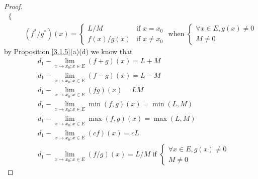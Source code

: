 \begin{proof}
\begin{align*}
\begin{cases}
                                                     \end{cases}                             \\
                                      & (f^* / g^*)(x) = \begin{cases}
                                                             L / M       & \text{if } x = x_0    \\
                                                             f(x) / g(x) & \text{if } x \neq x_0
                                                         \end{cases} \text{ when } \begin{cases}
                                                                                       \forall x \in E, g(x) \neq 0 \\
                                                                                       M \neq 0
                                                                                   \end{cases}
    \end{align*}
    by Proposition \ref{3.1.5}(a)(d) we know that
    \begin{align*}
         & d_1 - \lim_{x \to x_0 ; x \in E} (f + g)(x) = L + M                                          \\
         & d_1 - \lim_{x \to x_0 ; x \in E} (f - g)(x) = L - M                                          \\
         & d_1 - \lim_{x \to x_0 ; x \in E} (fg)(x) = LM                                                \\
         & d_1 - \lim_{x \to x_0 ; x \in E} \min(f, g)(x) = \min(L, M)                                  \\
         & d_1 - \lim_{x \to x_0 ; x \in E} \max(f, g)(x) = \max(L, M)                                  \\
         & d_1 - \lim_{x \to x_0 ; x \in E} (cf)(x) = cL                                                \\
         & d_1 - \lim_{x \to x_0 ; x \in E} (f / g)(x) = L / M \text{ if } \begin{cases}
                                                                               \forall x \in E, g(x) \neq 0 \\
                                                                               M \neq 0
                                                                           \end{cases}
    \end{align*}
\end{proof}